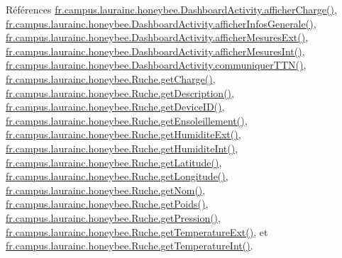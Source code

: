 Références \hyperlink{classfr_1_1campus_1_1laurainc_1_1honeybee_1_1_dashboard_activity_a13e1d8016723e33b6245e9e3063c8a4f}{fr.\+campus.\+laurainc.\+honeybee.\+Dashboard\+Activity.\+afficher\+Charge()}, \hyperlink{classfr_1_1campus_1_1laurainc_1_1honeybee_1_1_dashboard_activity_aaa61ed43c60c82f934647f15a38792cd}{fr.\+campus.\+laurainc.\+honeybee.\+Dashboard\+Activity.\+afficher\+Infos\+Generale()}, \hyperlink{classfr_1_1campus_1_1laurainc_1_1honeybee_1_1_dashboard_activity_afffb9de4776b6c6cea676a08251a58ba}{fr.\+campus.\+laurainc.\+honeybee.\+Dashboard\+Activity.\+afficher\+Mesures\+Ext()}, \hyperlink{classfr_1_1campus_1_1laurainc_1_1honeybee_1_1_dashboard_activity_aa177b8212619dec95e0a8eae4dbc867d}{fr.\+campus.\+laurainc.\+honeybee.\+Dashboard\+Activity.\+afficher\+Mesures\+Int()}, \hyperlink{classfr_1_1campus_1_1laurainc_1_1honeybee_1_1_dashboard_activity_abfefd572745e1034a025bc836812ae4f}{fr.\+campus.\+laurainc.\+honeybee.\+Dashboard\+Activity.\+communiquer\+T\+T\+N()}, \hyperlink{classfr_1_1campus_1_1laurainc_1_1honeybee_1_1_ruche_a28fe3a64c8aaf28cf15a96a8aa37e23b}{fr.\+campus.\+laurainc.\+honeybee.\+Ruche.\+get\+Charge()}, \hyperlink{classfr_1_1campus_1_1laurainc_1_1honeybee_1_1_ruche_ade21eb84d2a34d71cc2e89134b79cfd2}{fr.\+campus.\+laurainc.\+honeybee.\+Ruche.\+get\+Description()}, \hyperlink{classfr_1_1campus_1_1laurainc_1_1honeybee_1_1_ruche_a0cbf5aacc51f6a0fc5bd9def0f1a32c7}{fr.\+campus.\+laurainc.\+honeybee.\+Ruche.\+get\+Device\+I\+D()}, \hyperlink{classfr_1_1campus_1_1laurainc_1_1honeybee_1_1_ruche_a18a40461d368f06fd0532bfa1b63b868}{fr.\+campus.\+laurainc.\+honeybee.\+Ruche.\+get\+Ensoleillement()}, \hyperlink{classfr_1_1campus_1_1laurainc_1_1honeybee_1_1_ruche_a8e3b05a40fa1a699b7ffc1d15a7f6e31}{fr.\+campus.\+laurainc.\+honeybee.\+Ruche.\+get\+Humidite\+Ext()}, \hyperlink{classfr_1_1campus_1_1laurainc_1_1honeybee_1_1_ruche_ab4f2b99dbdcb4cfcb81827f294ffeb4a}{fr.\+campus.\+laurainc.\+honeybee.\+Ruche.\+get\+Humidite\+Int()}, \hyperlink{classfr_1_1campus_1_1laurainc_1_1honeybee_1_1_ruche_a3f03f6958a9251f72e60e45a6b8eb65c}{fr.\+campus.\+laurainc.\+honeybee.\+Ruche.\+get\+Latitude()}, \hyperlink{classfr_1_1campus_1_1laurainc_1_1honeybee_1_1_ruche_a45b3656e287e168f17fdd1b9ec5fbca1}{fr.\+campus.\+laurainc.\+honeybee.\+Ruche.\+get\+Longitude()}, \hyperlink{classfr_1_1campus_1_1laurainc_1_1honeybee_1_1_ruche_a0db4200faed3952a50f63fa7634be39b}{fr.\+campus.\+laurainc.\+honeybee.\+Ruche.\+get\+Nom()}, \hyperlink{classfr_1_1campus_1_1laurainc_1_1honeybee_1_1_ruche_a1dce2bd8e8de34d082abd36eab6693d3}{fr.\+campus.\+laurainc.\+honeybee.\+Ruche.\+get\+Poids()}, \hyperlink{classfr_1_1campus_1_1laurainc_1_1honeybee_1_1_ruche_a9d94748ece29463c420e93e0e7aa7acd}{fr.\+campus.\+laurainc.\+honeybee.\+Ruche.\+get\+Pression()}, \hyperlink{classfr_1_1campus_1_1laurainc_1_1honeybee_1_1_ruche_ac42e5846fb470d9ac9112c20c8679980}{fr.\+campus.\+laurainc.\+honeybee.\+Ruche.\+get\+Temperature\+Ext()}, et \hyperlink{classfr_1_1campus_1_1laurainc_1_1honeybee_1_1_ruche_aca5e489525d7f0cba7741a0d1803c5e5}{fr.\+campus.\+laurainc.\+honeybee.\+Ruche.\+get\+Temperature\+Int()}.


